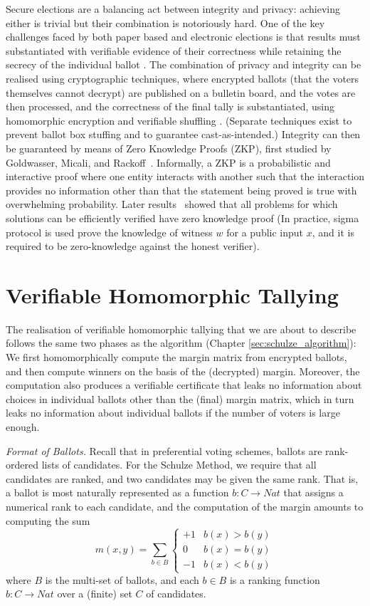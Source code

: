 Secure elections are a balancing act between integrity and privacy:
achieving either is trivial but their combination is notoriously hard.
One of the key challenges faced by both paper based and electronic
elections is that results must substantiated with
verifiable evidence of their correctness while retaining the secrecy
of the individual ballot \citep{Bernhard:2017:PES}. 
The combination of privacy and integrity can be realised using cryptographic techniques, where
encrypted ballots (that the voters themselves cannot decrypt) are
published on a bulletin board, and the votes are then processed, and
the correctness of the final tally is substantiated, using
homomorphic encryption \citep{Hirt:2000:ERF} and verifiable shuffling
\citep{Bayer:2012:EZK}. (Separate techniques exist to prevent ballot
box stuffing and to guarantee cast-as-intended.)
Integrity can then be guaranteed by means of Zero Knowledge Proofs
(ZKP),
first studied by Goldwasser, Micali, and Rackoff~\citep{Goldwasser:1985:STOC}.
Informally, a ZKP is a probabilistic and interactive proof where one
entity interacts with another such that the interaction provides
no information other than that the statement being proved is true with
overwhelming probability. 
Later results~\citep{Ben-Or:1988:CRYPTO,Goldreich:1991:ACM}
showed that 
all problems for which solutions can be efficiently verified have zero knowledge
proof (In practice, sigma protocol is used prove the knowledge of witness $w$ for a public input $x$, 
and it is required to be zero-knowledge against the honest verifier).

  
 \section{Verifiable Homomorphic Tallying}
\label{sec:verifiable_homomorphic}
The realisation of verifiable homomorphic tallying that we are about to
describe follows the same two phases as the algorithm (Chapter \ref{sec:schulze_algorithm}): 
We first homomorphically compute the margin matrix from encrypted ballots, and then compute
winners on the basis of the (decrypted) margin. Moreover, the computation also
produces a verifiable certificate that leaks no information about
choices in individual ballots other than the (final) margin matrix, which in
turn leaks no information about individual ballots if the number of
voters is large enough. 


\smallskip\noindent\emph{Format of Ballots.} Recall that in preferential voting
schemes, ballots are rank-ordered lists of candidates. For the
Schulze Method, we require that all candidates are ranked, and two
candidates may be given the same rank. That is, a ballot is most
naturally represented as a function $b: C \to Nat$ that assigns a
numerical rank to each candidate, and the computation of the margin
amounts to computing the sum
\[ m(x, y) = \sum_{b \in B} \begin{cases} +1 & b(x) > b(y) \\ 0 &
b(x) = b(y) \\ -1 & b(x) < b(y) \end{cases} \]
where $B$ is the multi-set of ballots, and each $b \in B$ is a
ranking function $b: C \to Nat$ over a (finite) set $C$ of
candidates. 

